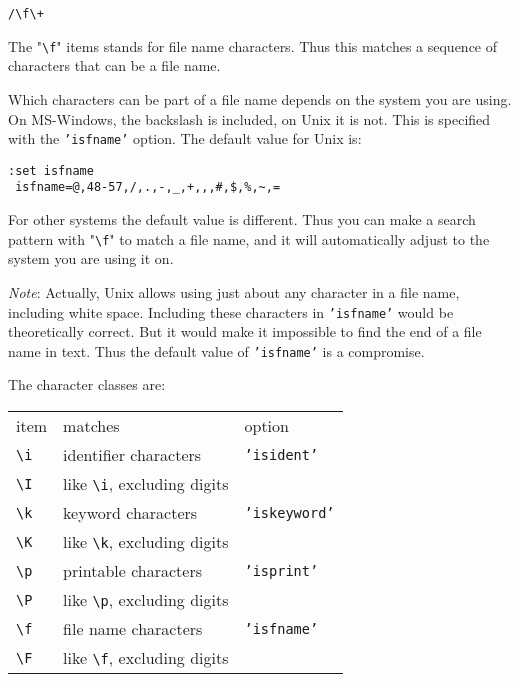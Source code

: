 \begin{Verbatim}[samepage=true]
 /\f\+
\end{Verbatim}

The "\texttt{\textbackslash{}f}" items stands for file name characters.
Thus this matches a sequence of characters that can be a file name.

Which characters can be part of a file name depends on the system you are using.
On MS-Windows, the backslash is included, on Unix it is not.
This is specified with the \texttt{'isfname'} option.
The default value for Unix is:

\begin{Verbatim}[samepage=true]
 :set isfname
 isfname=@,48-57,/,.,-,_,+,,,#,$,%,~,=
\end{Verbatim}

For other systems the default value is different.
Thus you can make a search pattern with "\texttt{\textbackslash{}f}" to match a file name, and it will automatically adjust to the system you are using it on.

\emph{Note}: Actually, Unix allows using just about any character in a file name, including white space.
Including these characters in \texttt{'isfname'} would be theoretically correct.
But it would make it impossible to find the end of a file name in text.
Thus the default value of \texttt{'isfname'} is a compromise.

The character classes are:

\begin{center} \begin{tabular}{l l l}
				item & matches & option \\
				\texttt{\textbackslash{}i} & identifier characters & \texttt{'isident'} \\
				\texttt{\textbackslash{}I} & like \texttt{\textbackslash{}i}, excluding digits & \\
				\texttt{\textbackslash{}k} & keyword characters & \texttt{'iskeyword'} \\
				\texttt{\textbackslash{}K} & like \texttt{\textbackslash{}k}, excluding digits & \\
				\texttt{\textbackslash{}p} & printable characters & \texttt{'isprint'} \\
				\texttt{\textbackslash{}P} & like \texttt{\textbackslash{}p}, excluding digits & \\
				\texttt{\textbackslash{}f} & file name characters & \texttt{'isfname'} \\
				\texttt{\textbackslash{}F} & like \texttt{\textbackslash{}f}, excluding digits & \\
\end{tabular} \end{center}
